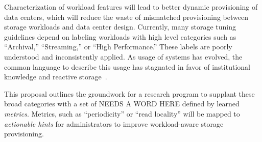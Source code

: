Characterization of workload                    
features will lead to better dynamic provisioning of data centers, which will                           
reduce the waste of mismatched provisioning between storage workloads and data
center design.  
Currently, many storage tuning guidelines depend on labeling workloads with high level categories such as ``Archival,'' ``Streaming,'' or ``High Performance.'' %
These labels are poorly
understood and inconsistently applied.  As usage of systems has evolved, the common
language to describe this usage has stagnated in favor of institutional knowledge and reactive storage~\cite{TK}.
%

This proposal outlines the groundwork for a research program to supplant these broad categories with a set of NEEDS A WORD HERE \mWs defined by learned \textit{metrics}.  Metrics, such as ``periodicity'' or ``read locality'' will be mapped to \textit{actionable hints} for administrators to improve workload-aware storage provisioning.
 


